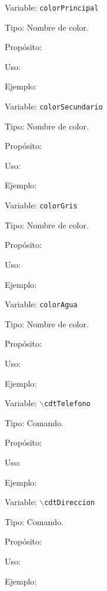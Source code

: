 \begin{Cdescription}
	\item[Variable:] {\tt colorPrincipal}
	\item[Tipo:] Nombre de color.
	\item[Propósito:]
	\item[Uso:]
	\item[Ejemplo:]
\end{Cdescription}

\begin{Cdescription}
	\item[Variable:] {\tt colorSecundario}
	\item[Tipo:] Nombre de color.
	\item[Propósito:]
	\item[Uso:]
	\item[Ejemplo:]
\end{Cdescription}

\begin{Cdescription}
	\item[Variable:] {\tt colorGris}
	\item[Tipo:] Nombre de color.
	\item[Propósito:]
	\item[Uso:]
	\item[Ejemplo:]
\end{Cdescription}

\begin{Cdescription}
	\item[Variable:] {\tt colorAgua}
	\item[Tipo:] Nombre de color.
	\item[Propósito:]
	\item[Uso:]
	\item[Ejemplo:]
\end{Cdescription}

\begin{Cdescription}
	\item[Variable:] {\tt $\backslash$cdtTelefono}
	\item[Tipo:] Comando.
	\item[Propósito:]
	\item[Uso:]
	\item[Ejemplo:]
\end{Cdescription}

\begin{Cdescription}
	\item[Variable:] {\tt $\backslash$cdtDireccion}
	\item[Tipo:] Comando.
	\item[Propósito:]
	\item[Uso:]
	\item[Ejemplo:]
\end{Cdescription}

